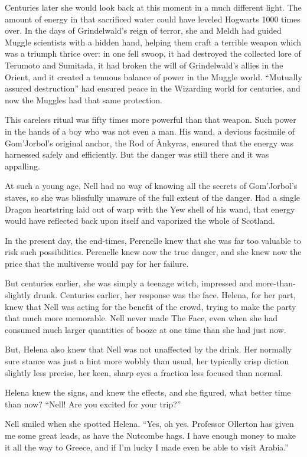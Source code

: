 Centuries later she would look back at this moment in a much different light. The amount of energy in that sacrificed water could have leveled Hogwarts 1000 times over. In the days of Grindelwald’s reign of terror, she and Meldh had guided Muggle scientists with a hidden hand, helping them craft a terrible weapon which was a triumph thrice over: in one fell swoop, it had destroyed the collected lore of Terumoto and Sumitada, it had broken the will of Grindelwald’s allies in the Orient, and it created a tenuous balance of power in the Muggle world. “Mutually assured destruction” had ensured peace in the Wizarding world for centuries, and now the Muggles had that same protection.

This careless ritual was fifty times more powerful than that weapon. Such power in the hands of a boy who was not even a man. His wand, a devious facsimile of Gom’Jorbol’s original anchor, the Rod of Ànkyras, ensured that the energy was harnessed safely and efficiently. But the danger was still there and it was appalling.

At such a young age, Nell had no way of knowing all the secrets of Gom’Jorbol’s staves, so she was blissfully unaware of the full extent of the danger. Had a single Dragon heartstring laid out of warp with the Yew shell of his wand, that energy would have reflected back upon itself and vaporized the whole of Scotland.

In the present day, the end-times, Perenelle knew that she was far too valuable to risk such possibilities. Perenelle knew now the true danger, and she knew now the price that the multiverse would pay for her failure.

But centuries earlier, she was simply a teenage witch, impressed and more-than-slightly drunk. Centuries earlier, her response was the face. Helena, for her part, knew that Nell was acting for the benefit of the crowd, trying to make the party that much more memorable. Nell never made The Face, even when she had consumed much larger quantities of booze at one time than she had just now.

But, Helena also knew that Nell was not unaffected by the drink. Her normally sure stance was just a hint more wobbly than usual, her typically crisp diction slightly less precise, her keen, sharp eyes a fraction less focused than normal.

Helena knew the signs, and knew the effects, and she figured, what better time than now? “Nell! Are you excited for your trip?”

Nell smiled when she spotted Helena. “Yes, oh yes. Professor Ollerton has given me some great leads, as have the Nutcombe hags. I have enough money to make it all the way to Greece, and if I’m lucky I made even be able to visit Arabia.”

